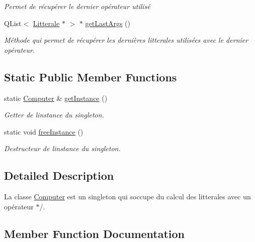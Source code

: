 \begin{DoxyCompactItemize}
\begin{DoxyCompactList}\small\item\em Permet de récupérer le dernier opérateur utilisé \end{DoxyCompactList}\item 
Q\+List$<$ \hyperlink{class_litterale}{Litterale} $\ast$ $>$ $\ast$ \hyperlink{class_computer_a3804a17a6441a746b06a79000f03aacb}{get\+Last\+Args} ()
\begin{DoxyCompactList}\small\item\em Méthode qui permet de récupérer les dernières litterales utilisées avec le dernier opérateur. \end{DoxyCompactList}\end{DoxyCompactItemize}
\subsection*{Static Public Member Functions}
\begin{DoxyCompactItemize}
\item 
static \hyperlink{class_computer}{Computer} \& \hyperlink{class_computer_ad102422d1f9a9b8a5537743571956906}{get\+Instance} ()
\begin{DoxyCompactList}\small\item\em Getter de l\textquotesingle{}instance du singleton. \end{DoxyCompactList}\item 
static void \hyperlink{class_computer_a9774870a8cc9fadfa5137c11ebbb70cf}{free\+Instance} ()\hypertarget{class_computer_a9774870a8cc9fadfa5137c11ebbb70cf}{}\label{class_computer_a9774870a8cc9fadfa5137c11ebbb70cf}

\begin{DoxyCompactList}\small\item\em Destructeur de l\textquotesingle{}instance du singleton. \end{DoxyCompactList}\end{DoxyCompactItemize}


\subsection{Detailed Description}
La classe \hyperlink{class_computer}{Computer} est un singleton qui s\textquotesingle{}occupe du calcul des litterales avec un opérateur $\ast$/. 

\subsection{Member Function Documentation}
